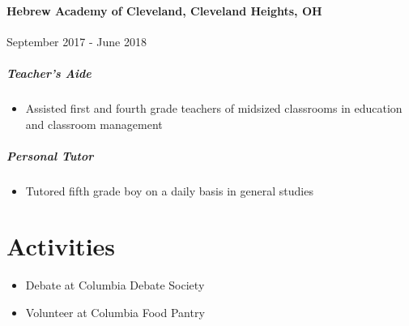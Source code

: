 \documentclass[10pt]{article}
\begin{document}
\paragraph*{Hebrew Academy of Cleveland, Cleveland Heights, OH} \hfill  September 2017 - June 2018
\subparagraph*{Teacher's Aide}
\begin{itemize}
    \item  Assisted first and fourth grade teachers of midsized classrooms in education and classroom management
\end{itemize}
\subparagraph*{Personal Tutor}
\begin{itemize}
    \item Tutored fifth grade boy on a daily basis in general studies
\end{itemize}


\vfill
\section*{Activities}

\begin{itemize}
    \item Debate at Columbia Debate Society
    \item Volunteer at Columbia Food Pantry
\end{itemize}



\end{document}
